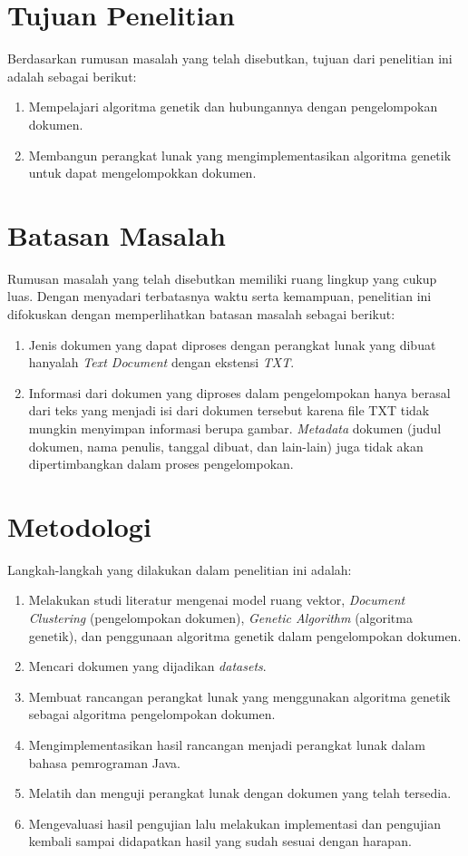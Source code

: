 \section{Tujuan Penelitian}
\label{sec:tujuan}
Berdasarkan rumusan masalah yang telah disebutkan, tujuan dari penelitian ini adalah sebagai berikut:

\begin{enumerate}
	\item Mempelajari algoritma genetik dan hubungannya dengan pengelompokan dokumen.
	\item Membangun perangkat lunak yang mengimplementasikan algoritma genetik untuk dapat mengelompokkan
dokumen.
\end{enumerate}

\section{Batasan Masalah}
\label{sec:batasan}
Rumusan masalah yang telah disebutkan memiliki ruang lingkup yang cukup luas. Dengan menyadari terbatasnya waktu serta kemampuan, penelitian ini difokuskan dengan memperlihatkan batasan masalah sebagai berikut:

\begin{enumerate}
	\item Jenis dokumen yang dapat diproses dengan perangkat lunak yang dibuat hanyalah \textit{Text Document} dengan ekstensi \textit{TXT}.
	\item Informasi dari dokumen yang diproses dalam pengelompokan hanya berasal dari teks yang menjadi isi dari dokumen tersebut karena file TXT tidak mungkin menyimpan informasi berupa gambar. \textit{Metadata} dokumen (judul dokumen, nama penulis, tanggal dibuat, dan lain-lain) juga tidak akan dipertimbangkan dalam proses pengelompokan.
\end{enumerate}


\section{Metodologi}
\label{sec:metlit}
Langkah-langkah yang dilakukan dalam penelitian ini adalah:

\begin{enumerate}
	\item Melakukan studi literatur mengenai model ruang vektor, {\it Document Clustering} (pengelompokan dokumen), {\it Genetic Algorithm} (algoritma genetik), dan penggunaan algoritma genetik dalam pengelompokan dokumen.
	\item Mencari dokumen yang dijadikan {\it datasets}.
	\item Membuat rancangan perangkat lunak yang menggunakan algoritma genetik sebagai algoritma pengelompokan dokumen.
	\item Mengimplementasikan hasil rancangan menjadi perangkat lunak dalam bahasa pemrograman Java.
	\item Melatih dan menguji perangkat lunak dengan dokumen yang telah tersedia.
	\item Mengevaluasi hasil pengujian lalu melakukan implementasi dan pengujian kembali sampai didapatkan hasil yang sudah sesuai dengan harapan.
\end{enumerate}

